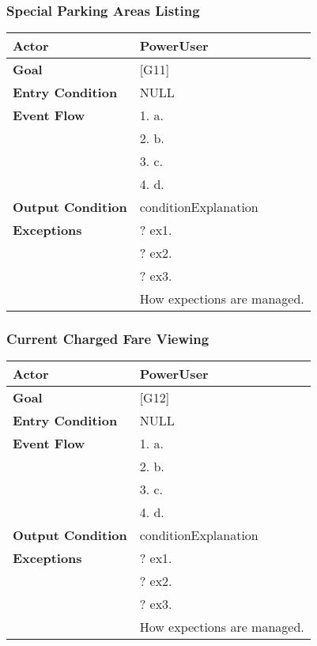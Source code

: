 \subsubsection{Special Parking Areas Listing}
\begin{tabular}{| l | p{8cm} |}
\hline
\textbf{Actor}      &       PowerUser \\
\hline
\textbf{Goal}       &       [G11]\\
\hline
\textbf{Entry Condition} &  NULL\\
\hline
\textbf{Event Flow}     &   1.	a.\\&
                                            2.	b.\\&
                                            3.	c.\\&
                                            4.  d.\\
\hline
\textbf{Output Condition} & conditionExplanation\\
\hline
\textbf{Exceptions} &       ?   ex1.\\& 
                            ?	ex2.\\&
                            ?	ex3.\\& 
                           How expections are managed.\\
\hline
\end{tabular} 


\subsubsection{Current Charged Fare Viewing}
\begin{tabular}{| l | p{8cm} |}
\hline
\textbf{Actor}      &       PowerUser \\
\hline
\textbf{Goal}       &       [G12]\\
\hline
\textbf{Entry Condition} &  NULL\\
\hline
\textbf{Event Flow}     &   1.	a.\\&
                                            2.	b.\\&
                                            3.	c.\\&
                                            4.  d.\\
\hline
\textbf{Output Condition} & conditionExplanation\\
\hline
\textbf{Exceptions} &       ?   ex1.\\& 
                            ?	ex2.\\&
                            ?	ex3.\\& 
                           How expections are managed.\\
\hline
\end{tabular} 


